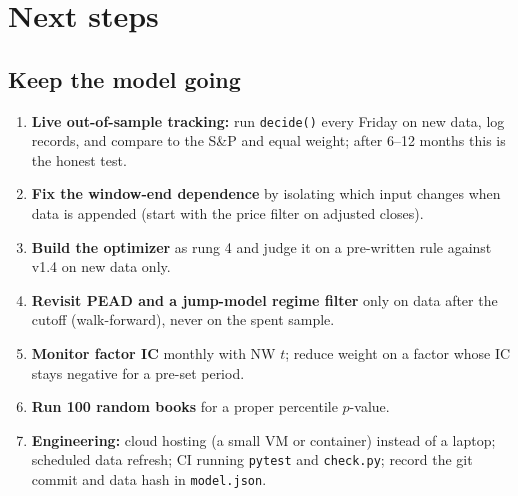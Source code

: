 \documentclass[11pt]{article}
\newcommand{\code}[1]{\texttt{#1}}
\begin{document}
\section{Next steps}

\subsection{Keep the model going}
\begin{enumerate}
\item \textbf{Live out-of-sample tracking:} run \code{decide()} every Friday on new data, log records, and compare to the S\&P and equal weight; after 6--12 months this is the honest test.
\item \textbf{Fix the window-end dependence} by isolating which input changes when data is appended (start with the price filter on adjusted closes).
\item \textbf{Build the optimizer} as rung 4 and judge it on a pre-written rule against v1.4 on new data only.
\item \textbf{Revisit PEAD and a jump-model regime filter} only on data after the cutoff (walk-forward), never on the spent sample.
\item \textbf{Monitor factor IC} monthly with NW $t$; reduce weight on a factor whose IC stays negative for a pre-set period.
\item \textbf{Run 100 random books} for a proper percentile $p$-value.
\item \textbf{Engineering:} cloud hosting (a small VM or container) instead of a laptop; scheduled data refresh; CI running \code{pytest} and \code{check.py}; record the git commit and data hash in \code{model.json}.
\end{enumerate}
\end{document}
